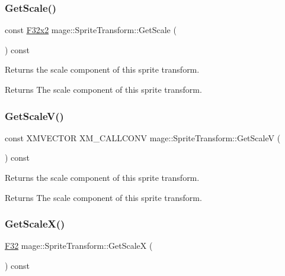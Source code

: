 \subsubsection{\texorpdfstring{Get\+Scale()}{GetScale()}}
{\footnotesize\ttfamily const \mbox{\hyperlink{namespacemage_a9dc0d34d6ecc87e4cfa4a826102117bc}{F32x2}} mage\+::\+Sprite\+Transform\+::\+Get\+Scale (\begin{DoxyParamCaption}{ }\end{DoxyParamCaption}) const\hspace{0.3cm}{\ttfamily [noexcept]}}

Returns the scale component of this sprite transform.

\begin{DoxyReturn}{Returns}
The scale component of this sprite transform. 
\end{DoxyReturn}
\mbox{\label{classmage_1_1_sprite_transform_ac201420d468fef1d1bb434cd7f1f0515}} 
\subsubsection{\texorpdfstring{Get\+Scale\+V()}{GetScaleV()}}
{\footnotesize\ttfamily const X\+M\+V\+E\+C\+T\+OR X\+M\+\_\+\+C\+A\+L\+L\+C\+O\+NV mage\+::\+Sprite\+Transform\+::\+Get\+ScaleV (\begin{DoxyParamCaption}{ }\end{DoxyParamCaption}) const\hspace{0.3cm}{\ttfamily [noexcept]}}

Returns the scale component of this sprite transform.

\begin{DoxyReturn}{Returns}
The scale component of this sprite transform. 
\end{DoxyReturn}
\mbox{\label{classmage_1_1_sprite_transform_af82246da3228dfc1588ca806ddf6315f}} 
\subsubsection{\texorpdfstring{Get\+Scale\+X()}{GetScaleX()}}
{\footnotesize\ttfamily \mbox{\hyperlink{namespacemage_aa97e833b45f06d60a0a9c4fc22ae02c0}{F32}} mage\+::\+Sprite\+Transform\+::\+Get\+ScaleX (\begin{DoxyParamCaption}{ }\end{DoxyParamCaption}) const\hspace{0.3cm}{\ttfamily [noexcept]}}

